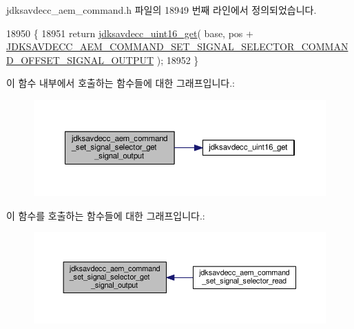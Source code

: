 jdksavdecc\+\_\+aem\+\_\+command.\+h 파일의 18949 번째 라인에서 정의되었습니다.


\begin{DoxyCode}
18950 \{
18951     \textcolor{keywordflow}{return} \hyperlink{group__endian_ga3fbbbc20be954aa61e039872965b0dc9}{jdksavdecc\_uint16\_get}( base, pos + 
      \hyperlink{group__command__set__signal__selector_ga7c95a215ae574070ed11b812779f2cbb}{JDKSAVDECC\_AEM\_COMMAND\_SET\_SIGNAL\_SELECTOR\_COMMAND\_OFFSET\_SIGNAL\_OUTPUT}
       );
18952 \}
\end{DoxyCode}


이 함수 내부에서 호출하는 함수들에 대한 그래프입니다.\+:
\nopagebreak
\begin{figure}[H]
\begin{center}
\leavevmode
\includegraphics[width=350pt]{group__command__set__signal__selector_ga24e3ce61ff4f56c8feb2f7a31d378542_cgraph}
\end{center}
\end{figure}




이 함수를 호출하는 함수들에 대한 그래프입니다.\+:
\nopagebreak
\begin{figure}[H]
\begin{center}
\leavevmode
\includegraphics[width=350pt]{group__command__set__signal__selector_ga24e3ce61ff4f56c8feb2f7a31d378542_icgraph}
\end{center}
\end{figure}


